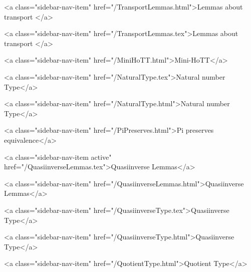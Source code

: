       
        
          <a class="sidebar-nav-item" href="/TransportLemmas.html">Lemmas about transport </a>
        
      
    
      
        
          <a class="sidebar-nav-item" href="/TransportLemmas.tex">Lemmas about transport </a>
        
      
    
      
        
          <a class="sidebar-nav-item" href="/MiniHoTT.html">Mini-HoTT</a>
        
      
    
      
        
          <a class="sidebar-nav-item" href="/NaturalType.tex">Natural number Type</a>
        
      
    
      
        
          <a class="sidebar-nav-item" href="/NaturalType.html">Natural number Type</a>
        
      
    
      
        
          <a class="sidebar-nav-item" href="/PiPreserves.html">Pi preserves equivalence</a>
        
      
    
      
        
          <a class="sidebar-nav-item active" href="/QuasiinverseLemmas.tex">Quasiinverse Lemmas</a>
        
      
    
      
        
          <a class="sidebar-nav-item" href="/QuasiinverseLemmas.html">Quasiinverse Lemmas</a>
        
      
    
      
        
          <a class="sidebar-nav-item" href="/QuasiinverseType.tex">Quasiinverse Type</a>
        
      
    
      
        
          <a class="sidebar-nav-item" href="/QuasiinverseType.html">Quasiinverse Type</a>
        
      
    
      
        
          <a class="sidebar-nav-item" href="/QuotientType.html">Quotient Type</a>
        
